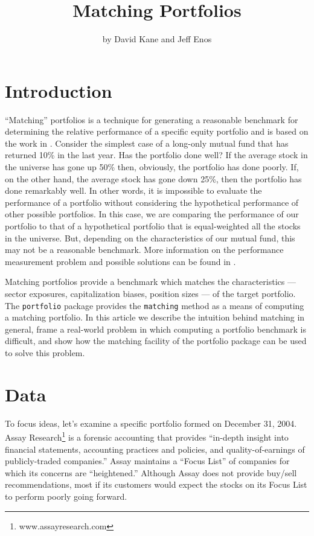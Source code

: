 \documentclass{article}
\begin{document}
\title{Matching Portfolios}
\author{by David Kane and Jeff Enos}


\maketitle

\section{Introduction}

``Matching'' portfolios is a technique for generating a reasonable
benchmark for determining the relative performance of a specific
equity portfolio and is based on the work in \citet{matchit.paper}.
Consider the simplest case of a long-only mutual fund that has
returned 10\% in the last year. Has the portfolio done well? If the
average stock in the universe has gone up 50\% then, obviously, the
portfolio has done poorly. If, on the other hand, the average stock
has gone down 25\%, then the portfolio has done remarkably well.  In
other words, it is impossible to evaluate the performance of a
portfolio without considering the hypothetical performance of other
possible portfolios. In this case, we are comparing the performance of
our portfolio to that of a hypothetical portfolio that is
equal-weighted all the stocks in the universe. But, depending on the
characteristics of our mutual fund, this may not be a reasonable
benchmark.  More information on the performance measurement problem
and possible solutions can be found in \citet{burns2004}.

Matching portfolios provide a benchmark which matches the
characteristics --- sector exposures, capitalization biases, position
sizes --- of the target portfolio.  The \texttt{portfolio} package
provides the \texttt{matching} method as a means of computing a
matching portfolio.  In this article we describe the intuition behind
matching in general, frame a real-world problem in which computing a
portfolio benchmark is difficult, and show how the matching facility
of the portfolio package can be used to solve this problem.

\section{Data}



To focus ideas, let's examine a specific portfolio formed on December
31, 2004. Assay Research\footnote{www.assayresearch.com} is a
forensic accounting that provides ``in-depth insight into financial
statements, accounting practices and policies, and quality-of-earnings
of publicly-traded companies.'' Assay maintains a ``Focus List'' of
companies for which its concerns are ``heightened.'' Although Assay
does not provide buy/sell recommendations, most if its customers would
expect the stocks on its Focus List to perform poorly going forward.
\end{document}
